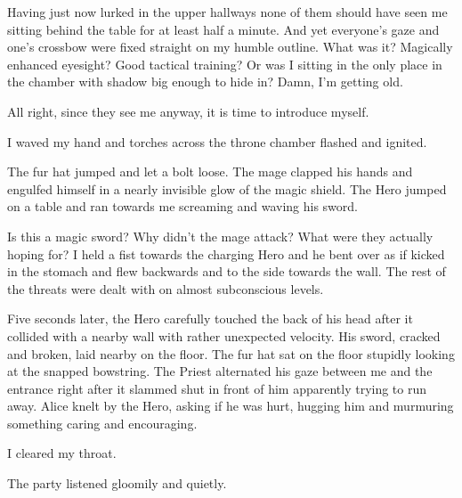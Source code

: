 Having just now lurked in the upper hallways none of them should have seen me sitting behind the table for at least half a minute. And yet everyone's gaze and one's crossbow were fixed straight on my humble outline. What was it? Magically enhanced eyesight? Good tactical training? Or was I sitting in the only place in the chamber with shadow big enough to hide in? Damn, I'm getting old.

All right, since they see me anyway, it is time to introduce myself.

 I waved my hand and torches across the throne chamber flashed and ignited. 

The fur hat jumped and let a bolt loose. The mage clapped his hands and engulfed himself in a nearly invisible glow of the magic shield. The Hero jumped on a table and ran towards me screaming and waving his sword.

Is this a magic sword? Why didn't the mage attack? What were they actually hoping for? I held a fist towards the charging Hero and he bent over as if kicked in the stomach and flew backwards and to the side towards the wall. The rest of the threats were dealt with on almost subconscious levels.

Five seconds later, the Hero carefully touched the back of his head after it collided with a nearby wall with rather unexpected velocity. His sword, cracked and broken, laid nearby on the floor. The fur hat sat on the floor stupidly looking at the snapped bowstring. The Priest alternated his gaze between me and the entrance right after it slammed shut in front of him apparently trying to run away. Alice knelt by the Hero, asking if he was hurt, hugging him and murmuring something caring and encouraging.

I cleared my throat.


The party listened gloomily and quietly.


